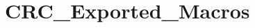 \hypertarget{group__CRC__Exported__Macros}{
\section{CRC\_\-Exported\_\-Macros}
\label{group__CRC__Exported__Macros}
}
